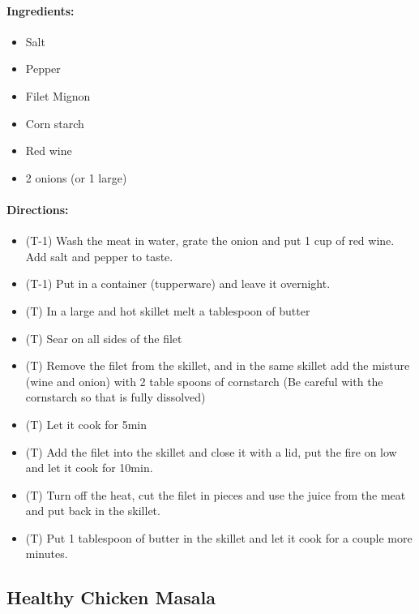 \documentclass{article}
\begin{document}
\paragraph{Ingredients:}
\begin{itemize}
    \item Salt
    \item Pepper
    \item Filet Mignon
    \item Corn starch
    \item Red wine
    \item 2 onions (or 1 large)
\end{itemize}

\paragraph{Directions:}
\begin{itemize}
    \item (T-1) Wash the meat in water, grate the onion and put 1 cup of red wine. Add salt and pepper to taste.
    \item (T-1) Put in a container (tupperware) and leave it overnight.
    \item (T) In a large and hot skillet melt a tablespoon of butter
    \item (T) Sear on all sides of the filet
    \item (T) Remove the filet from the skillet, and in the same skillet add the misture (wine and onion) with 2 table spoons of cornstarch (Be careful with the cornstarch so that is fully dissolved)
    \item (T) Let it cook for 5min
    \item (T) Add the filet into the skillet and close it with a lid, put the fire on low and let it cook for 10min.
    \item (T) Turn off the heat, cut the filet in pieces and use the juice from the meat and put back in the skillet.
    \item (T) Put 1 tablespoon of butter in the skillet and let it cook for a couple more minutes.
\end{itemize}

\subsection{Healthy Chicken Masala}
\end{document}
